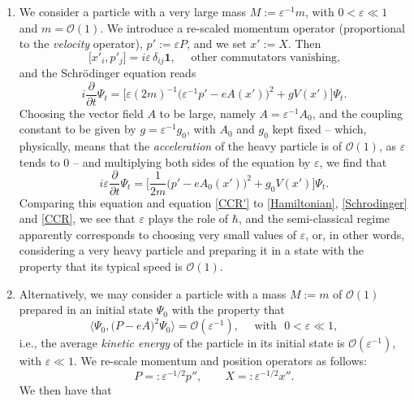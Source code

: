 \documentclass[11pt]{article}
\begin{document}
\begin{enumerate}
\item{We consider a particle with a very large mass $M:=\varepsilon^{-1}m$, with $0<\varepsilon \ll 1$ and 
$m= \mathcal{O}(1)$. We introduce a re-scaled momentum operator (proportional to the \textit{velocity} operator),
$p':= \varepsilon P$, and we set $x':=X$. Then
\begin{equation}\label{CCR'}
\big[x'_i, p'_j\big] = i \varepsilon\, \delta_{ij}\mathbf{1}, \quad \text{ other commutators vanishing,}
\end{equation}
and the Schr\"odinger equation reads
$$i\frac{\partial}{\partial t} \Psi_t = \Big[\varepsilon(2m)^{-1} \big(\varepsilon^{-1}p'- eA(x')\big)^{2}+ g V(x')\Big] \Psi_t.$$
Choosing the vector field $A$ to be large, namely $A= \varepsilon^{-1} A_0$, and the coupling constant to be given by 
$g= \varepsilon^{-1} g_0$, with $A_0$ and $g_0$ kept fixed -- which, physically, means that the \textit{acceleration} 
of the heavy particle is of $\mathcal{O}(1)$, as $\varepsilon$ tends to 0 -- and multiplying both sides of the 
equation by $\varepsilon$, we find that
$$i\varepsilon \frac{\partial}{\partial t}\Psi_t = \Big[\frac{1}{2m} \big(p'- eA_0(x')\big)^{2} + g_0 V(x')\Big] \Psi_t.$$
Comparing this equation and equation \eqref{CCR'} to \eqref{Hamiltonian}, \eqref{Schrodinger} and \eqref{CCR},
we see that $\varepsilon$ plays the role of $\hbar$, and the semi-classical regime apparently corresponds to choosing 
very small values of $\varepsilon$, or, in other words, considering a very heavy particle and preparing it in a state with the property that its typical speed is $\mathcal{O}(1)$.}
\item{Alternatively, we may consider a particle with a mass $M:=m$ of $\mathcal{O}(1)$ prepared in an initial 
state $\Psi_0$ with the property that 
\begin{equation}\label{high-speed}
\langle \Psi_0, \big(P-eA\big)^{2} \Psi_0 \rangle = \mathcal{O}(\varepsilon^{-1}),\quad \text{ with } \,\, 0< \varepsilon \ll 1,
\end{equation}
i.e., the average \textit{kinetic energy} of the particle in its initial state is $\mathcal{O}(\varepsilon^{-1})$, with 
$\varepsilon \ll 1$. We re-scale momentum and position operators as follows:
\begin{equation}\label{rescale}
P=: \varepsilon^{-1/2} p'', \qquad X=:\varepsilon^{-1/2} x''.
\end{equation}
We then have that
\begin{equation}\label{CCR''}

\end{equation}}
\end{enumerate}
\end{document}
